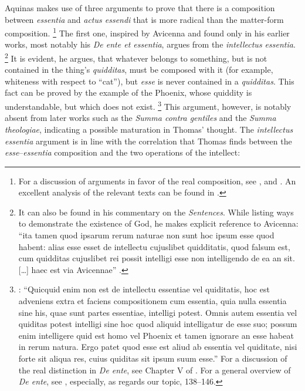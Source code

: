 Aquinas makes use of three arguments to prove that there is a composition between \emph{essentia} and \emph{actus essendi} that is more radical than the matter-form composition.%
%
\footnote{For a discussion of arguments in favor of the real composition, see \cite[211-215]{fabro:nozione}, and \cite[133–161]{wippel:metaphysical_themes_1}. An excellent analysis of the relevant texts can be found in \cite[94-107]{definance:etre-et-agir}.} The first one, inspired by Avicenna and found only in his earlier works, most notably  his \emph{De ente et essentia}, argues from the \emph{intellectus essentia}.%
%
\footnote{It can also be found in his commentary on the \emph{Sentences}. While listing ways to demonstrate the existence of God, he makes explicit reference to Avicenna: “ita tamen quod ipsarum rerum naturae non sunt hoc ipsum esse quod habent: alias esse esset de intellectu cujuslibet quidditatis, quod falsum est, cum quidditas cujuslibet rei possit intelligi esse non intelligendo de ea an sit. [\ldots] haec est via Avicennae” \parencite[lib.~2, d.~1, q.~1, a.~1, co.]{st:sent}.}
%
It is evident, he argues, that whatever belongs to something, but is not contained in the thing’s \emph{quidditas}, must be composed with it (for example, whiteness with respect to “cat”), but \emph{esse} is never contained in a \emph{quidditas}. This fact can be proved by the example of the Phoenix, whose quiddity is understandable, but which does not exist.%
%
\footnote{\Cite[cap.~3]{st:deente}: “Quicquid enim non est de intellectu essentiae vel quiditatis, hoc est adveniens extra et faciens compositionem cum essentia, quia nulla essentia sine his, quae sunt partes essentiae, intelligi potest. Omnis autem essentia vel quiditas potest intelligi sine hoc quod aliquid intelligatur de esse suo; possum enim intelligere quid est homo vel Phoenix et tamen ignorare an esse habeat in rerum natura. Ergo patet quod esse est aliud ab essentia vel quiditate, nisi forte sit aliqua res, cuius quiditas sit ipsum suum esse.” For a discussion of the real distinction in \emph{De ente}, see Chapter V of \cite[107–132]{wippel:metaphysical_themes_1}.
For a general overview of \emph{De ente}, see \cite{giorgini:ente}, especially, as regards our topic, 138–146.}
%
This argument, however, is notably absent from later works such as the \emph{Summa contra gentiles} and the \emph{Summa theologiae}, indicating a possible maturation in Thomas’ thought. The \emph{intellectus essentia} argument is in line with the correlation that Thomas finds between the \emph{esse}–\emph{essentia} composition and the two operations of the intellect:

